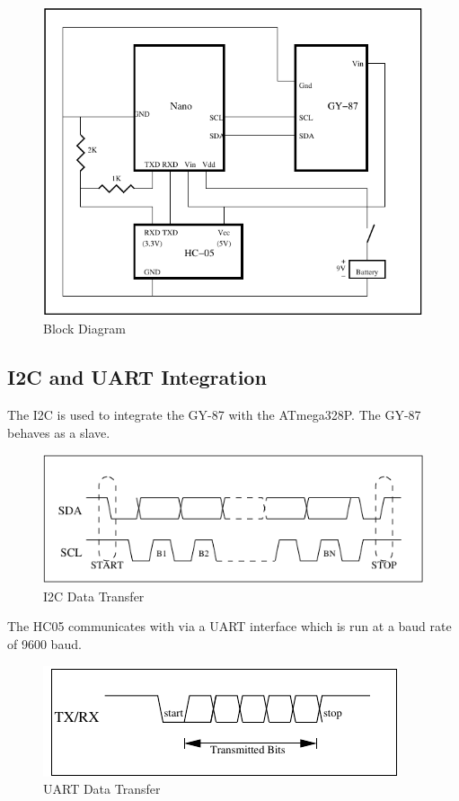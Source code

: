 \documentclass[11pt, a4paper]{article}
\begin{document}
\begin{figure}[htb]
    \centering
    \includegraphics[width=\linewidth]{BD.pdf}
    \caption{Block Diagram}
    \label{fig:bd}
\end{figure}


\subsection{I2C and UART Integration}
The I2C is used to integrate the GY-87 with the ATmega328P. The GY-87 behaves
as a slave. 

\begin{figure}[htb]
    \centering
    \includegraphics[width=\linewidth]{I2C_Timing.pdf}
    \caption{I2C Data Transfer}
    \label{fig:i2c_timing}
\end{figure}

\noindent The HC05 communicates with via a UART interface which is run at a
baud rate of 9600 baud.

\begin{figure}[htb]
    \centering
    \includegraphics[width=\linewidth]{UART_Timing.pdf}
    \caption{UART Data Transfer}
    \label{fig:uart_timing}
\end{figure}
\end{document}

